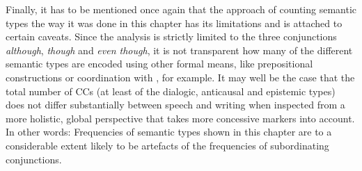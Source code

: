 Finally, it has to be mentioned once again that the approach of counting semantic types the way it was done in this chapter has its limitations and is attached to certain caveats. Since the analysis is strictly limited to the three conjunctions \textit{although}, \textit{though} and \textit{even though}, it is not transparent how many of the different semantic types are encoded using other formal means, like prepositional constructions or coordination with , for example. It may well be the case that the total number of CCs (at least of the dialogic, anticausal and epistemic types) does not differ substantially between speech and writing when inspected from a more holistic, global perspective that takes more concessive markers into account. In other words: Frequencies of semantic types shown in this chapter are to a considerable extent likely to be artefacts of the frequencies of subordinating conjunctions.

